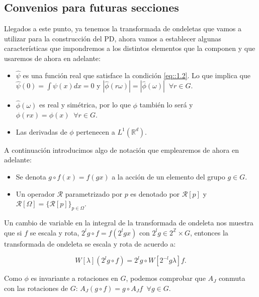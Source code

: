 \medskip


\subsection{Convenios para futuras secciones}

\noindent Llegados a este punto, ya tenemos la transformada de ondeletas que vamos a utilizar para la construcción del PD, ahora vamos a establecer algunas características que impondremos a los distintos elementos que la componen y que usaremos de ahora en adelante: 

\begin{itemize}
    \item $\widehat{\psi}$ es una función real que satisface la condición \eqref{eq::1.2}. Lo que implica que $\widehat{\psi}(0)=\int \psi(x)dx=0$ y $|\widehat{\phi}(r\omega)|=|\widehat{\phi}(\omega)| \;\; \forall r\in G$.
    \item $\widehat{\phi}(\omega)$ es real y simétrica, por lo que $\phi$ también lo será y $\phi(rx)=\phi(x) \;\; \forall r \in G$. 
    \item Las derivadas de $\phi$ pertenecen a $L^1(\mathbb{R}^d)$.
\end{itemize}

\medskip

\noindent A continuación introducimos algo de notación que emplearemos de ahora en adelante: 

\begin{itemize}

  \item Se denota $g \circ f(x)=f(gx)$ a la acción de un elemento del grupo $g\in G$.
  \item Un operador  $\mathcal{R}$ parametrizado por $p$ es denotado por $\mathcal{R}[p]$ y $\mathcal{R}[\Omega]=\lbrace \mathcal{R}[p] \rbrace_{p \in \Omega}$. 
\end{itemize}

\noindent Un cambio de variable en la integral de la transformada de ondeleta nos muestra que si $f$ se escala y rota, $2^lg \circ f=f(2^lgx)$ con $2^lg \in 2^{\mathbb{Z}} \times G$, entonces la transformada de ondeleta se escala y rota de acuerdo a: 

\begin{equation}
  W[\lambda](2^lg\circ f)=2^lg \circ W[2^{-l}g\lambda]f.
\end{equation}

\medskip

\noindent Como $\phi$ es invariante a rotaciones en $G$, podemos comprobar que $A_J$ conmuta con las rotaciones de $G$: $A_J(g\circ f)=g\circ A_J f \;\; \forall g \in G$. 

